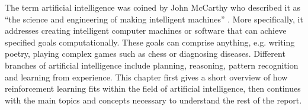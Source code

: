 The term artificial intelligence was coined by John McCarthy who described it as ``the science and engineering of making intelligent machines'' \parencite{McCarthy2007:Online}. More specifically, it addresses creating intelligent computer machines or software that can achieve specified goals computationally. These goals can comprise anything, e.g. writing poetry, playing complex games such as chess or diagnosing diseases. Different branches of artificial intelligence include planning, reasoning, pattern recognition and learning from experience. This chapter first gives a short overview of how reinforcement learning fits within the field of artificial intelligence, then continues with the main topics and concepts necessary to understand the rest of the report. 
